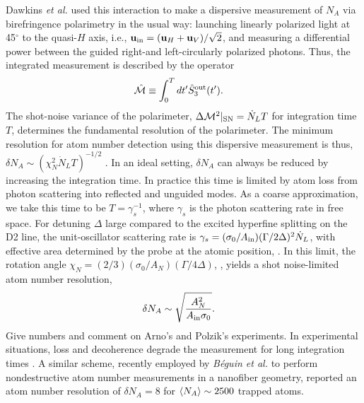 \documentclass[preprint, aps,pra,onecolumn]{revtex4-1} %
\newcommand{\inp}{{\rm in}}
\newcommand{\shotnoise}{\Delta \mathcal{M}^2 |_{\rm SN}}
\newcommand{\chiN}{\chi_{N}}
\newcommand{\Abir}{A_N}
\newcommand{\comment}[1]{{\color{Maroon} #1}}
\begin{document}
Dawkins {\em et al.} \cite{dawkins_dispersive_2011} used this interaction to make a dispersive measurement of $N_A$ via birefringence polarimetry in the usual way: launching linearly polarized light at 45$^\circ$ to the quasi-$H$ axis, i.e., $\mbf{u}_\inp = (\mbf{u}_H + \mbf{u}_V )/\sqrt{2}$, and measuring  a differential power between the guided right-and left-circularly polarized photons. 
Thus, the integrated measurement is described by the operator
\begin{align} \label{Eq::MeasOpAtomCounting}
		\hat{\mathcal{M}} & \equiv \int_0^T dt' \hat{S}^{\rm out}_3(t').
\end{align} 
The shot-noise variance of the polarimeter, $\shotnoise =  \dot{N}_L T$ for integration time $T$,  determines the fundamental resolution of the polarimeter.  
The minimum resolution for atom number detection using this dispersive measurement is thus, $\delta N_A \sim ( \chiN^2 \dot{N}_L T)^{-1/2}$ \cite{smith_faraday_2003}.  
In an ideal setting, $\delta N_A$ can always be reduced by increasing the integration time. In practice this time is limited by atom loss from photon scattering into reflected and unguided modes. 
As a coarse approximation, we take this time to be $T=\gamma_s^{-1}$, where $\gamma_s$ is the photon scattering rate in free space.  
For detuning $\Delta$ large compared to the excited hyperfine splitting on the D2 line, the unit-oscillator scattering rate is $\gamma_s =(\sigma_0 /A_{\rm in})(\Gamma/2 \Delta)^2 \dot{N}_L $, with effective area determined by the probe at the atomic position, .  
In this limit, the rotation angle $\chiN = (2/3) (\sigma_0/\Abir)(\Gamma/4\Delta)$, , yields a shot noise-limited atom number resolution, 
	\begin{align} \label{Eq::AtomNumberResolution}
		\delta N_A  &\sim \sqrt {\frac{\Abir^2}{A_{\rm in} \sigma_0}}.
	\end{align}
\comment{Give numbers and comment on Arno's and Polzik's experiments.} 
In experimental situations, loss and decoherence degrade the measurement for long integration times \cite{dawkins_dispersive_2011, zhang_collective_2012}. 
A similar scheme, recently employed by \emph{B\'{e}guin et al.} \cite{beguin_generation_2014} to perform nondestructive atom number measurements in a nanofiber geometry,  reported an atom number resolution of $\delta N_A = 8$ for $\langle{N_A}\rangle\sim2500$ trapped atoms.



\end{document}
